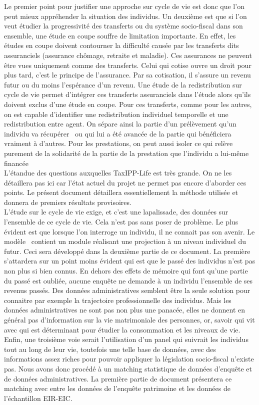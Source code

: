 Le premier point pour justifier une approche sur cycle de vie est donc que l'on peut mieux appréhender la situation des individus. Un deuxième est que si l'on veut étudier la progressivité des transferts ou du système socio-fiscal dans son ensemble, une étude en coupe souffre de limitation importante. 
En effet, les études en coupe doivent contourner la difficulté causée par les transferts dits assuranciels (assurance chômage, retraite et maladie). Ces assurances ne peuvent être vues uniquement comme des transferts. Celui qui cotise ouvre un droit pour plus tard, c'est le principe de l'assurance. Par sa cotisation, il s'assure un revenu futur ou du moins l'espérance d'un revenu. Une étude de la redistribution sur cycle de vie permet d'intégrer ces transferts assuranciels dans l'étude alors qu'ils doivent exclus d'une étude en coupe. Pour ces transferts, comme pour les autres, on est capable d'identifier une redistribution individuel temporelle et une redistribution entre agent. On sépare ainsi la partie d'un prélèvement qu'un individu va \og récupérer \fg \ ou qui lui a été avancée de la partie qui bénéficiera vraiment à d'autres. Pour les prestations, on peut aussi isoler ce qui relève purement de la solidarité de la partie de la prestation que l'individu a lui-même financée \\

L'étandue des questions auxquelles TaxIPP-Life est très grande. On ne les détaillera pas ici car l'état actuel du projet ne permet pas encore d'aborder ces points. Le présent document détaillera essentiellement la méthode utilisée et donnera de premiers résultats provisoires.\\

L'étude sur le cycle de vie exige, et c'est une lapalissade, des données sur l'ensemble de ce cycle de vie. Cela n'est pas sans poser de problème. Le plus évident est que lorsque l'on interroge un individu, il ne connait pas son avenir. Le modèle \til \ contient un module réalisant une projection à un niveau individuel du futur. Ceci sera développé dans la deuxième partie de ce document. La première s'attardera sur un point moins évident qui est que le passé des individus n'est pas non plus si bien connus. En dehors des effets de mémoire qui font qu'une partie du passé est oubliée, aucune enquête ne demande à un individu l'ensemble de ses revenus passés. Des données administratives semblent être la seule solution pour connaitre par exemple la trajectoire professionnelle des individus. Mais les données administratives ne sont pas non plus une panacée, elles ne donnent en général pas d'information sur la vie matrimoniale des personnes, or, savoir qui vit avec qui est déterminant pour étudier la consommation et les niveaux de vie. Enfin, une troisième voie serait l'utilisation d'un panel qui suivrait les individus tout au long de leur vie, toutefois une telle base de données, avec des informations assez riches pour pouvoir appliquer la législation socio-fiscal n'existe pas. Nous avons donc procédé à un matching statistique de données d'enquête et de données administratives. La première partie de document présentera ce matching avec entre les données de l'enquête patrimoine et les données de l'échantillon EIR-EIC.
